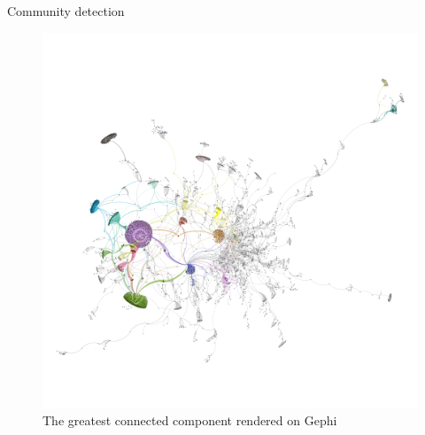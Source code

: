 \documentclass{beamer}
\begin{document}
    \begin{frame}{}
        \begin{block}{Community detection}
            \begin{figure}
                \includegraphics[scale=0.2]{gephi_1.png}
                \caption{The greatest connected component rendered on Gephi}\label{fig:gephi_1}
            \end{figure}
        \end{block}
    \end{frame}
\end{document}
